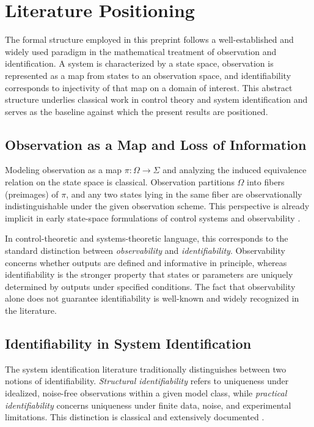 ﻿\section{Literature Positioning}
\label{sec:literature}

The formal structure employed in this preprint follows a well-established and
widely used paradigm in the mathematical treatment of observation and
identification.
A system is characterized by a state space, observation is represented as a map
from states to an observation space, and identifiability corresponds to
injectivity of that map on a domain of interest.
This abstract structure underlies classical work in control theory and system
identification and serves as the baseline against which the present results are
positioned.

\subsection{Observation as a Map and Loss of Information}

Modeling observation as a map
\(\pi:\Omega\to\Sigma\) and analyzing the induced equivalence relation on the
state space is classical.
Observation partitions \(\Omega\) into fibers (preimages) of \(\pi\), and any two
states lying in the same fiber are observationally indistinguishable under the
given observation scheme.
This perspective is already implicit in early state-space formulations of
control systems and observability
\cite{kalman1960}.

In control-theoretic and systems-theoretic language, this corresponds to the
standard distinction between \emph{observability} and
\emph{identifiability}.
Observability concerns whether outputs are defined and informative in principle,
whereas identifiability is the stronger property that states or parameters are
uniquely determined by outputs under specified conditions.
The fact that observability alone does not guarantee identifiability is
well-known and widely recognized in the literature.

\subsection{Identifiability in System Identification}

The system identification literature traditionally distinguishes between two
notions of identifiability.
\emph{Structural identifiability} refers to uniqueness under idealized,
noise-free observations within a given model class, while
\emph{practical identifiability} concerns uniqueness under finite data, noise,
and experimental limitations.
This distinction is classical and extensively documented
\cite{ljung1999,walter1997}.

